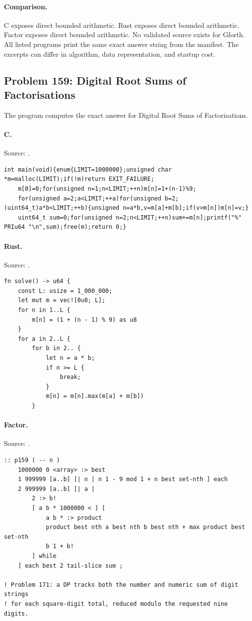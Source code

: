\paragraph{Comparison.}
C exposes direct bounded arithmetic. Rust exposes direct bounded arithmetic. Factor exposes direct bounded arithmetic.
No validated source exists for Gforth.
All listed programs print the same exact answer string from the manifest. The excerpts can differ in algorithm, data representation, and startup cost.

\subsection{Problem 159: Digital Root Sums of Factorisations}
\label{walkthrough:p159}
The program computes the exact answer for Digital Root Sums of Factorisations.

\paragraph{C.} Source: .
\begin{lstlisting}
int main(void){enum{LIMIT=1000000};unsigned char *m=malloc(LIMIT);if(!m)return EXIT_FAILURE;
    m[0]=0;for(unsigned n=1;n<LIMIT;++n)m[n]=1+(n-1)%9;
    for(unsigned a=2;a<LIMIT;++a)for(unsigned b=2;(uint64_t)a*b<LIMIT;++b){unsigned n=a*b,v=m[a]+m[b];if(v>m[n])m[n]=v;}
    uint64_t sum=0;for(unsigned n=2;n<LIMIT;++n)sum+=m[n];printf("%" PRIu64 "\n",sum);free(m);return 0;}
\end{lstlisting}

\paragraph{Rust.} Source: .
\begin{lstlisting}
fn solve() -> u64 {
    const L: usize = 1_000_000;
    let mut m = vec![0u8; L];
    for n in 1..L {
        m[n] = (1 + (n - 1) % 9) as u8
    }
    for a in 2..L {
        for b in 2.. {
            let n = a * b;
            if n >= L {
                break;
            }
            m[n] = m[n].max(m[a] + m[b])
        }
\end{lstlisting}

\paragraph{Factor.} Source: .
\begin{lstlisting}
:: p159 ( -- n )
    1000000 0 <array> :> best
    1 999999 [a..b] [| n | n 1 - 9 mod 1 + n best set-nth ] each
    2 999999 [a..b] [| a |
        2 :> b!
        [ a b * 1000000 < ] [
            a b * :> product
            product best nth a best nth b best nth + max product best set-nth
            b 1 + b!
        ] while
    ] each best 2 tail-slice sum ;

! Problem 171: a DP tracks both the number and numeric sum of digit strings
! for each square-digit total, reduced modulo the requested nine digits.
\end{lstlisting}

